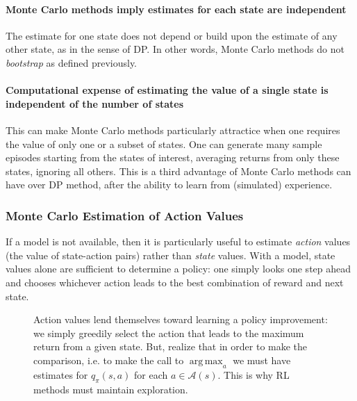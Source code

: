 \documentclass[12pt]{article}
\DeclareMathOperator*{\argmax}{arg\,max}
\begin{document}
\paragraph{Monte Carlo methods imply estimates for each state are independent} The estimate for one state does not depend or build upon the estimate of any other state, as in the sense of DP. In other words, Monte Carlo methods do not \emph{bootstrap} as defined previously.

\paragraph{Computational expense of estimating the value of a single state is independent of the number of states} This can make Monte Carlo methods particularly attractice when one requires the value of only one or a subset of states. One can generate many sample episodes starting from the states of interest, averaging returns from only these states, ignoring all others. This is a third advantage of Monte Carlo methods can have over DP method, after the ability to learn from (simulated) experience.

\subsubsection{Monte Carlo Estimation of Action Values}
If a model is not available, then it is particularly useful to estimate \emph{action} values (the value of state-action pairs) rather than \emph{state} values. With a model, state values alone are sufficient to determine a policy: one simply looks one step ahead and chooses whichever action leads to the best combination of reward and next state.
\begin{figure}[h]
  \centering
  \caption{\footnotesize Action values lend themselves toward learning a policy improvement: we simply greedily select the action that leads to the maximum return from a given state. But, realize that in order to make the comparison, i.e. to make the call to $\argmax_a$ we must have estimates for $q_\pi(s,a)$ for each $a \in \mathcal A(s)$. This is why RL methods must maintain exploration.}
\end{figure}
\end{document}
